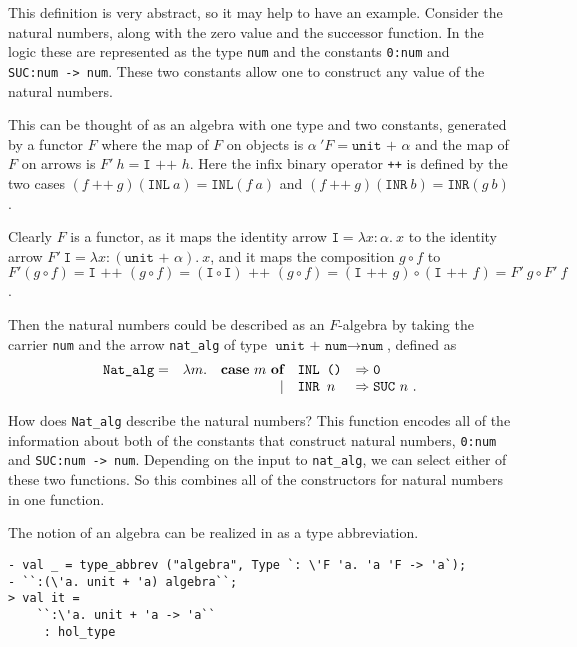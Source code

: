 This definition is very abstract, so it may help to have an example. Consider
the natural numbers, along with the zero value and the successor function.
In the \HOL{} logic these are represented as the type \texttt{num} and the constants
\texttt{0:num} and \texttt{SUC:num~->~num}.
These two constants allow one to construct any value of the natural numbers.

This can be thought of as an algebra with one type and two constants, generated
by a functor $F$ where the map of $F$ on objects is $\alpha~'F = \texttt{unit~+~}\alpha$
and the map of $F$ on arrows is $F'~h = \texttt{I~++~}h$. Here the infix binary operator
\texttt{++} is defined by the two cases
$(f~\texttt{++}~g) (\texttt{INL}~a) = \texttt{INL} (f~a)$ and
$(f~\texttt{++}~g) (\texttt{INR}~b) = \texttt{INR} (g~b)$.

Clearly $F$ is a functor, as it maps the identity arrow $\texttt{I} = \lambda x{:}\alpha.~x$
to the identity arrow $F'~\texttt{I} = \lambda x{:}(\texttt{unit~+~}\alpha).~x$, and
it maps the composition $g \circ f$ to 
$F'(g \circ f) = \texttt{I~++~}(g \circ f) = 
(\texttt{I} \circ \texttt{I})\texttt{~++~}(g \circ f) = 
(\texttt{I~++~}g) \circ (\texttt{I~++~}f) = F'~g \circ F'~f$.

Then the natural numbers could be described as an $F$-algebra by taking the carrier 
\texttt{num} and the arrow \texttt{nat\_alg} of type 
$\texttt{unit~+~num} \rightarrow \texttt{num}$, defined as
\setlength{\arraycolsep}{1.0mm}
$$
\begin{array}[t]{llrll}
\texttt{Nat\_alg} = &
\lambda m. & \mbox{\bf case}\ m\ \mbox{\bf of} & \texttt{INL~()} & \Rightarrow \texttt{0} \\
&          &                            {\mid} & \texttt{INR~}n  & \Rightarrow \texttt{SUC}~n
           \ .
\end{array}
$$

How does \texttt{Nat\_alg} describe the natural numbers? This function
encodes all of the information about both of the constants that construct natural
numbers, \texttt{0:num} and \texttt{SUC:num~->~num}. Depending on the input to
\texttt{nat\_alg}, we can select either of these two functions. So this combines
all of the constructors for natural numbers in one function.

The notion of an algebra can be realized in \HOLW{} as a type abbreviation.
\begin{session}
\begin{verbatim}
- val _ = type_abbrev ("algebra", Type `: \'F 'a. 'a 'F -> 'a`);
- ``:(\'a. unit + 'a) algebra``;
> val it =
    ``:\'a. unit + 'a -> 'a``
     : hol_type
\end{verbatim}
\end{session}

